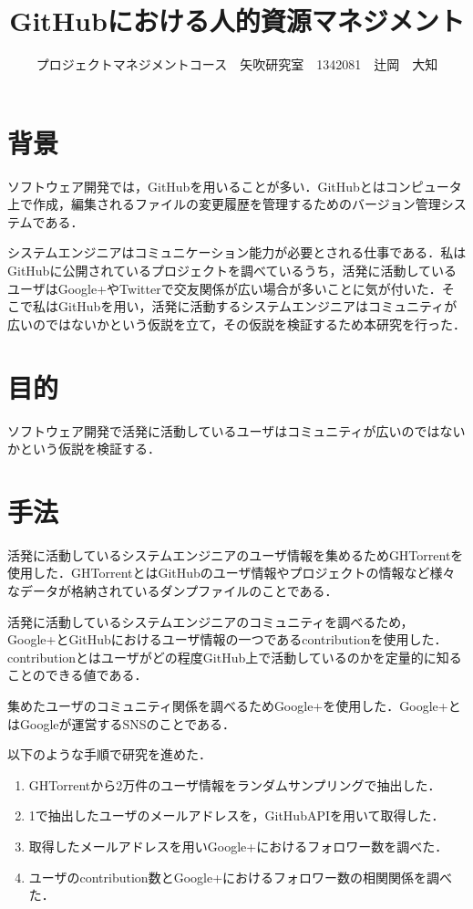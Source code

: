 \documentclass[uplatex,twocolumn,dvipdfmx]{jsarticle}
\title{\vspace{-5mm}\fontsize{14pt}{0pt}\selectfont GitHubにおける人的資源マネジメント}
\author{\normalsize プロジェクトマネジメントコース　矢吹研究室　1342081　辻岡　大知}
\date{}
\begin{document}
\fontsize{10.5pt}{\baselineskip}\selectfont
\maketitle





\section{背景}

ソフトウェア開発では，GitHubを用いることが多い．GitHubとはコンピュータ上で作成，編集されるファイルの変更履歴を管理するためのバージョン管理システムである．\cite{a}


システムエンジニアはコミュニケーション能力が必要とされる仕事である．私はGitHubに公開されているプロジェクトを調べているうち，活発に活動しているユーザはGoogle+やTwitterで交友関係が広い場合が多いことに気が付いた．そこで私はGitHubを用い，活発に活動するシステムエンジニアはコミュニティが広いのではないかという仮説を立て，その仮説を検証するため本研究を行った．


\section{目的}

ソフトウェア開発で活発に活動しているユーザはコミュニティが広いのではないかという仮説を検証する．

\section{手法}

活発に活動しているシステムエンジニアのユーザ情報を集めるためGHTorrentを使用した．GHTorrentとはGitHubのユーザ情報やプロジェクトの情報など様々なデータが格納されているダンプファイルのことである．

活発に活動しているシステムエンジニアのコミュニティを調べるため，Google+とGitHubにおけるユーザ情報の一つであるcontributionを使用した．contributionとはユーザがどの程度GitHub上で活動しているのかを定量的に知ることのできる値である．

集めたユーザのコミュニティ関係を調べるためGoogle+を使用した．Google+とはGoogleが運営するSNSのことである．

以下のような手順で研究を進めた．

\begin{enumerate}
 \item GHTorrentから2万件のユーザ情報をランダムサンプリングで抽出した．
 \item 1で抽出したユーザのメールアドレスを，GitHubAPIを用いて取得した．
 \item 取得したメールアドレスを用いGoogle+におけるフォロワー数を調べた．
 \item ユーザのcontribution数とGoogle+におけるフォロワー数の相関関係を調べた．
\end{enumerate}
\end{document}
